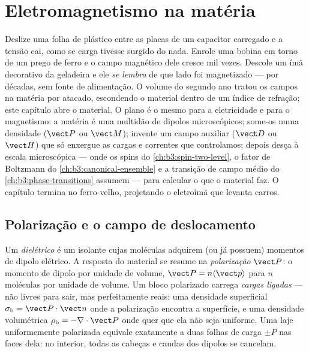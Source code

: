 \chapter{Eletromagnetismo na matéria}\label{ch:b3:electromagnetism-in-matter}


Deslize uma folha de plástico entre as placas de um capacitor carregado
e a tensão cai, como se carga tivesse surgido do nada. Enrole uma bobina
em torno de um prego de ferro e o campo magnético dele cresce mil vezes.
Descole um ímã decorativo da geladeira e ele \emph{se lembra} de que
lado foi magnetizado --- por décadas, sem fonte de alimentação. O volume
do segundo ano tratou os campos na matéria por atacado, escondendo o
material dentro de um índice de refração; este capítulo abre o material.
O plano é o mesmo para a eletricidade e para o magnetismo: a matéria é
uma multidão de dipolos microscópicos; some-os numa densidade ($\vect P$
ou $\vect M$); invente um campo auxiliar ($\vect D$ ou $\vect H$) que só
enxergue as cargas e correntes que controlamos; depois desça à escala
microscópica --- onde os spins do \cref{ch:b3:spin-two-level}, o fator de
Boltzmann do \cref{ch:b3:canonical-ensemble} e a transição de campo médio
do \cref{ch:b3:phase-transitions} assumem --- para calcular o que o
material faz. O capítulo termina no ferro-velho, projetando o
eletroímã que levanta carros.

\section{Polarização e o campo de deslocamento}

\begin{definition}\label{def:b3:electromagnetism-in-matter:polarisation}
Um \emph{dielétrico} é um isolante cujas moléculas adquirem (ou já
possuem) momentos de dipolo elétrico. A resposta do material se
resume na \emph{polarização} $\vect P$: o momento de dipolo
por unidade de volume, $\vect P = n\langle\vect p\rangle$ para $n$ moléculas
por unidade de volume. Um bloco polarizado carrega \emph{cargas ligadas}
--- não livres para sair, mas perfeitamente reais: uma densidade
superficial $\sigma_{\text{b}} = \vect P\cdot\vect n$ onde a polarização
encontra a superfície, e uma densidade volumétrica $\rho_{\text{b}} =
-\nabla\cdot\vect P$ onde quer que ela não seja uniforme. Uma laje
uniformemente polarizada equivale exatamente a duas folhas de carga $\pm P$
nas faces dela: no interior, todas as cabeças e caudas dos dipolos se cancelam.
\end{definition}

